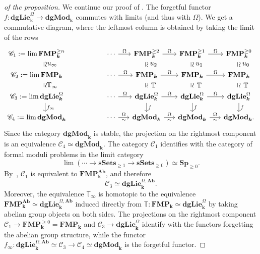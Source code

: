 \documentclass[JEP,XML,SOM,Unicode,NoEqCountersInSection]{cedram}
\let\mathcal\mathscr
\let\autoref\Cref
\theoremstyle{definition}
\newcommand{\T}{\mathbb{T}}
\newcommand{\Cc}{\mathcal{C}}
\newcommand{\sSets}{\mathbf{sSets}}
\newcommand{\Sp}{\mathbf{Sp}}
\newcommand{\dgLie}{\mathbf{dgLie}}
\newcommand{\dgMod}{\mathbf{dgMod}}
\newcommand{\FMP}{\mathbf{FMP}}
\newcommand{\Ab}{\mathbf{Ab}}
\renewcommand{\k}{{\boldsymbol{k}}}
\begin{document}
\begin{proof}[of the proposition]
We continue our proof of \autoref{prop:abelianlie}. The forgetful functor $f \colon \dgLie_\k^{\Omega} \to \dgMod_\k$ commutes with limits (and thus with $\Omega$). We get a commutative diagram, where the leftmost column is obtained by taking the limit of the rows
\[
\begin{tikzcd}[row sep=1.3em, column sep=1.6em]
\Cc_1 := \lim \FMP_\k^{\geq n} \phantom{:= \Cc_1} \ar[phantom, yshift=0.1em]{d}[sloped]{\simeq}[xshift=1em]{ u_\infty} &
\quad \cdots \ar{r}{\Omega} &
\FMP_\k^{\geq 2} \ar{r}{\Omega} \ar[phantom, yshift=0.1em]{d}[sloped]{\simeq}[xshift=1em]{ u_2} & \FMP_\k^{\geq 1} \ar{r}{\Omega} \ar[phantom, yshift=0.1em]{d}[sloped]{\simeq}[xshift=1em]{ u_1} & \FMP_\k^{\geq 0} \ar[phantom, yshift=0.1em]{d}[sloped]{\simeq}[xshift=1em]{ u_0}
\\
\Cc_2 := \lim \FMP_\k \phantom{:= \Cc_2} \ar[phantom]{d}[sloped]{\simeq}[xshift=1em]{ \T_\infty} & \quad \cdots \ar{r}{\Omega} & \FMP_\k \ar{r}{\Omega} \ar[phantom]{d}[sloped]{\simeq}[xshift=1em]{ \T} & \FMP_\k \ar{r}{\Omega} \ar[phantom]{d}[sloped]{\simeq}[xshift=1em]{ \T} & \FMP_\k \ar[phantom]{d}[sloped]{\simeq}[xshift=1em]{ \T}
\\
\Cc_3 := \lim \dgLie^\Omega_\k \phantom{:= \Cc_3} \ar{d}{f_\infty} & \quad \cdots \ar{r}{\Omega} & \dgLie_\k^\Omega \ar{r}{\Omega} \ar{d}{f} & \dgLie_\k^\Omega \ar{r}{\Omega} \ar{d}{f} & \dgLie_\k^\Omega \ar{d}{f}
\\
\Cc_4 := \lim \dgMod_\k \phantom{:= \Cc_4} & \quad \cdots \ar{r}{\Omega}[swap]{\sim} & \dgMod_\k \ar{r}{\Omega}[swap]{\sim} & \dgMod_\k \ar{r}{\Omega}[swap]{\sim} & \dgMod_\k.
\end{tikzcd}
\]
Since the category $\dgMod_\k$ is stable, the projection on the rightmost component is an equivalence $\Cc_4 \simeq \dgMod_\k$.
The category $\Cc_1$ identifies with the category of formal moduli problems in the limit category
\[
\lim (\cdots \to \sSets_{\geq 1} \to \sSets_{\geq 0}) \simeq \Sp_{\geq 0}.
\]
By~\cite[Rem.\,5.2.6.26]{lurie:halg}, $\Cc_1$ is equivalent to $\FMP_\k^\Ab$, and therefore
\[
\Cc_3 \simeq \dgLie_\k^{\Omega,\Ab}.
\]
Moreover, the equivalence $\T_\infty$ is homotopic to the equivalence $\FMP_\k^\Ab \simeq \dgLie_\k^{\Omega,\Ab}$ induced directly from $\T \colon \FMP_\k \simeq \dgLie_\k^\Omega$ by taking abelian group objects on both sides.
The projections on the rightmost component $\Cc_1 \to \FMP_\k^{\geq 0} = \FMP_\k$ and $\Cc_3 \to \dgLie_\k^\Omega$ identify with the functors forgetting the abelian group structure, while the functor $f_\infty \colon \dgLie_\k^{\Omega,\Ab} \simeq \Cc_3 \to \Cc_4 \simeq \dgMod_\k$ is the forgetful functor.


\end{proof}
\end{document}
